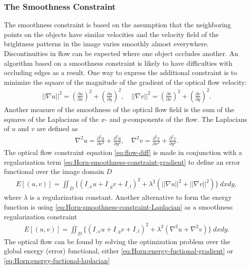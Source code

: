 \documentclass[letterpaper,11pt]{article}
\begin{document}
\subsubsection*{The Smoothness Constraint}
The smoothness constraint is based on the assumption that the neighboring points on the objects have similar velocities and the velocity field of the
brightness patterns in the image varies smoothly almost everywhere. Discontinuities in flow can be expected where one object occludes another. An algorithm based on a smoothness constraint is likely to have difficulties with
occluding edges as a result. One way to express the additional constraint is to minimize the square of the
magnitude of the gradient of the optical flow velocity: 
\begin{align}
|| \nabla u ||^2 = (\frac{\partial u}{\partial x})^2 + (\frac{\partial u}{\partial y})^2, \quad || \nabla v ||^2 = (\frac{\partial v}{\partial x})^2 + (\frac{\partial v}{\partial y})^2.
\label{eq:Horn-smoothness-constraint-gradient}
\end{align}
Another measure of the smoothness of the optical flow field is the sum of the squares of the Laplacians of the $x$- and $y$-components of the flow. The Laplacians of $u$ and $v$ are defined as
\begin{align}
\nabla^2 u = \frac{\partial^2 u}{\partial x^2} + \frac{\partial^2 u}{\partial y^2}, \quad \nabla^2 v = \frac{\partial^2 v}{\partial x^2} + \frac{\partial^2 v}{\partial y^2}.
\label{eq:Horn-smoothness-constraint-Laplacian}
\end{align}
The optical flow constraint equation \eqref{eq:flow-diff} is made in conjunction with a regularization term \eqref{eq:Horn-smoothness-constraint-gradient} to define an error functional over the image domain $D$
\begin{align}
E[(u,v)] = \iint_D \Big \{  (I_{,x} u + I_{,y} v + I_{,t})^2 + \lambda^2 ( || \nabla u ||^2 + ||\nabla v|| ^2 ) \Big \} ~ dx dy,  
\label{eq:Horn:energy-fuctional-gradient}
\end{align}
where $\lambda$ is a regularization constant. Another alternative to form the energy function is using \eqref{eq:Horn-smoothness-constraint-Laplacian} as a smoothness regularization constraint
\begin{align}
E[(u,v)] = \iint_D \Big \{  (I_{,x} u + I_{,y} v + I_{,t})^2 + \lambda^2 ( \nabla^2 u + \nabla^2 v ) \Big \} ~ dx dy.  
\label{eq:Horn:energy-fuctional-laplacian}
\end{align}   
The optical flow can be found by solving the optimization problem over the global energy (error) functional, either \eqref{eq:Horn:energy-fuctional-gradient} or \eqref{eq:Horn:energy-fuctional-laplacian}
\end{document}
